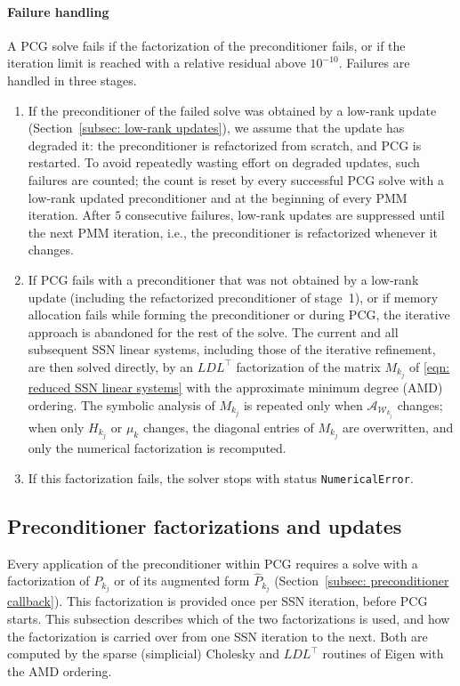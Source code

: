 \paragraph{Failure handling} A PCG solve fails if the factorization of the preconditioner fails, or if the iteration limit is reached with a relative residual above $10^{-10}$. Failures are handled in three stages.
\begin{enumerate}
    \item If the preconditioner of the failed solve was obtained by a low-rank update (Section~\ref{subsec: low-rank updates}), we assume that the update has degraded it: the preconditioner is refactorized from scratch, and PCG is restarted. To avoid repeatedly wasting effort on degraded updates, such failures are counted; the count is reset by every successful PCG solve with a low-rank updated preconditioner and at the beginning of every PMM iteration. After $5$ consecutive failures, low-rank updates are suppressed until the next PMM iteration, i.e., the preconditioner is refactorized whenever it changes.
    \item If PCG fails with a preconditioner that was not obtained by a low-rank update (including the refactorized preconditioner of stage~1), or if memory allocation fails while forming the preconditioner or during PCG, the iterative approach is abandoned for the rest of the solve. The current and all subsequent SSN linear systems, including those of the iterative refinement, are then solved directly, by an $LDL^\top$ factorization of the matrix $M_{k_j}$ of \eqref{eqn: reduced SSN linear systems} with the approximate minimum degree (AMD) ordering. The symbolic analysis of $M_{k_j}$ is repeated only when $\mathcal{A}_{\mathcal{W}_{k_j}}$ changes; when only $H_{k_j}$ or $\mu_k$ changes, the diagonal entries of $M_{k_j}$ are overwritten, and only the numerical factorization is recomputed.
    \item If this factorization fails, the solver stops with status \texttt{NumericalError}.
\end{enumerate}


\subsection{Preconditioner factorizations and updates} \label{subsec: preconditioner factorizations}

Every application of the preconditioner within PCG requires a solve with a factorization of $P_{k_j}$ or of its augmented form $\widehat{P}_{k_j}$ (Section~\ref{subsec: preconditioner callback}). This factorization is provided once per SSN iteration, before PCG starts. This subsection describes which of the two factorizations is used, and how the factorization is carried over from one SSN iteration to the next. Both are computed by the sparse (simplicial) Cholesky and $LDL^\top$ routines of Eigen with the AMD ordering.

